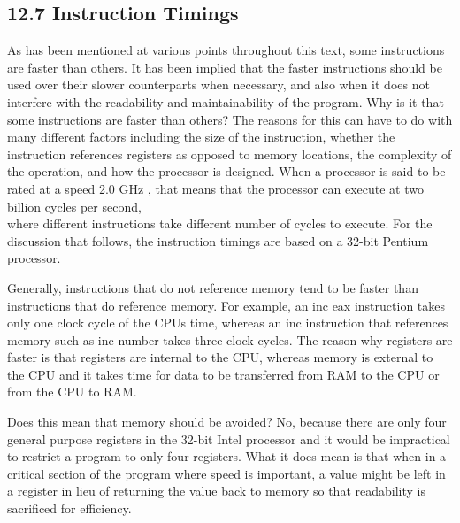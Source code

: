 \documentclass[10pt]{book}
\begin{document}
\begin{center}
\begin{center}
\begin{center}
\begin{center}
\begin{center}
\subsection*{12.7 Instruction Timings}
As has been mentioned at various points throughout this text, some instructions are faster than others. It has been implied that the faster instructions should be used over their slower counterparts when necessary, and also when it does not interfere with the readability and maintainability of the program. Why is it that some instructions are faster than others? The reasons for this can have to do with many different factors including the size of the instruction, whether the instruction references registers as opposed to memory locations, the complexity of the operation, and how the processor is designed. When a processor is said to be rated at a speed 2.0 GHz , that means that the processor can execute at two billion cycles per second,\\
where different instructions take different number of cycles to execute. For the discussion that follows, the instruction timings are based on a 32-bit Pentium processor.


Generally, instructions that do not reference memory tend to be faster than instructions that do reference memory. For example, an inc eax instruction takes only one clock cycle of the CPUs time, whereas an inc instruction that references memory such as inc number takes three clock cycles. The reason why registers are faster is that registers are internal to the CPU, whereas memory is external to the CPU and it takes time for data to be transferred from RAM to the CPU or from the CPU to RAM.

Does this mean that memory should be avoided? No, because there are only four general purpose registers in the 32-bit Intel processor and it would be impractical to restrict a program to only four registers. What it does mean is that when in a critical section of the program where speed is important, a value might be left in a register in lieu of returning the value back to memory so that readability is sacrificed for efficiency.


\end{center}
\end{center}
\end{center}
\end{center}
\end{center}
\end{document}

